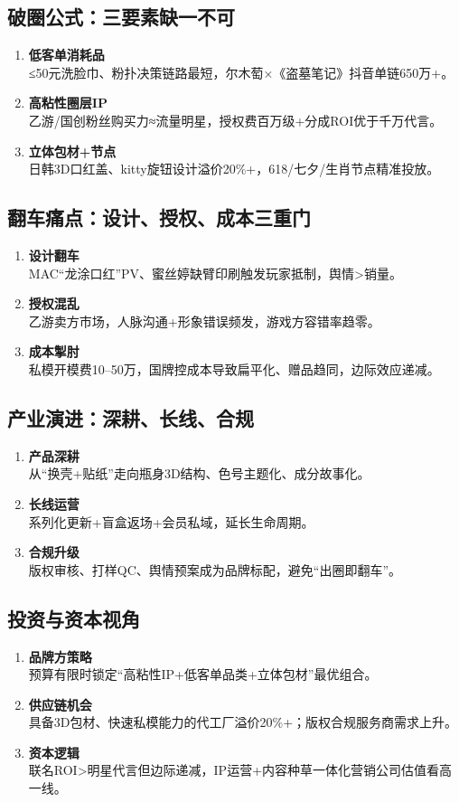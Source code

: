 \subsection{破圈公式：三要素缺一不可}
\begin{enumerate}[leftmargin=*, nosep]
    \item \textbf{低客单消耗品}  \\
    ≤50元洗脸巾、粉扑决策链路最短，尔木萄×《盗墓笔记》抖音单链650万+。
    \item \textbf{高粘性圈层IP}  \\
    乙游/国创粉丝购买力≈流量明星，授权费百万级+分成ROI优于千万代言。
    \item \textbf{立体包材+节点}  \\
    日韩3D口红盖、kitty旋钮设计溢价20\%+，618/七夕/生肖节点精准投放。
\end{enumerate}

\subsection{翻车痛点：设计、授权、成本三重门}
\begin{enumerate}[leftmargin=*, nosep]
    \item \textbf{设计翻车}  \\
    MAC“龙涂口红”PV、蜜丝婷缺臂印刷触发玩家抵制，舆情>销量。
    \item \textbf{授权混乱}  \\
    乙游卖方市场，人脉沟通+形象错误频发，游戏方容错率趋零。
    \item \textbf{成本掣肘}  \\
    私模开模费10–50万，国牌控成本导致扁平化、赠品趋同，边际效应递减。
\end{enumerate}

\subsection{产业演进：深耕、长线、合规}
\begin{enumerate}[leftmargin=*, nosep]
    \item \textbf{产品深耕}  \\
    从“换壳+贴纸”走向瓶身3D结构、色号主题化、成分故事化。
    \item \textbf{长线运营}  \\
    系列化更新+盲盒返场+会员私域，延长生命周期。
    \item \textbf{合规升级}  \\
    版权审核、打样QC、舆情预案成为品牌标配，避免“出圈即翻车”。
\end{enumerate}

\subsection{投资与资本视角}
\begin{enumerate}[leftmargin=*, nosep]
    \item \textbf{品牌方策略}  \\
    预算有限时锁定“高粘性IP+低客单品类+立体包材”最优组合。
    \item \textbf{供应链机会}  \\
    具备3D包材、快速私模能力的代工厂溢价20\%+；版权合规服务商需求上升。
    \item \textbf{资本逻辑}  \\
    联名ROI>明星代言但边际递减，IP运营+内容种草一体化营销公司估值看高一线。
\end{enumerate}




